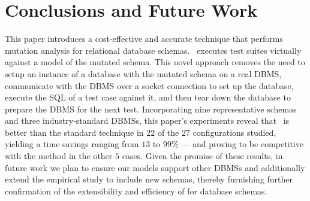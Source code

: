 
\vspace*{-.5em}

\section{Conclusions and Future Work}
\label{sec:conclusions}


This paper introduces a cost-effective and accurate technique that performs mutation analysis for relational database schemas. \Vma~executes test suites virtually against a model of the mutated schema. This novel approach removes the need to setup an instance of a database with the mutated schema on a real DBMS, communicate with the DBMS over a socket connection to set up the database, execute the SQL \INSERTs of a test case against it, and then tear down the database to prepare the DBMS for the next test. Incorporating nine representative schemas and three industry-standard DBMSs, this paper's experiments reveal that \vma~is better than the standard technique in $22$ of the $27$ configurations studied, yielding a time savings ranging from $13$ to $99\%$ --- and proving to be competitive with the \Original method in the other $5$ cases.  Given the promise of these results, in future work we plan to ensure our models support other DBMSs and additionally extend the empirical study to include new schemas, thereby furnishing further confirmation of the extensibility and efficiency of \vma for database schemas.

